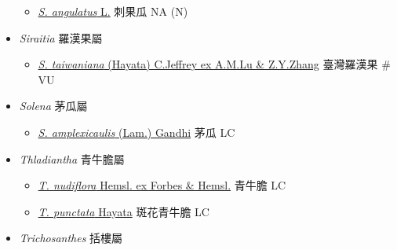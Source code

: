 \begin{itemize}
  \begin{itemize}
        \item[] \href{http://www.theplantlist.org/tpl1.1/search?q=Sicyos+angulatus}{\textit{S. angulatus} L.}   刺果瓜   NA (N)
  \end{itemize}
 \item[] \textit{Siraitia} 羅漢果屬
                                
  \begin{itemize}
        \item[] \href{http://www.theplantlist.org/tpl1.1/search?q=Siraitia+taiwaniana}{\textit{S. taiwaniana} (Hayata) C.Jeffrey ex A.M.Lu \& Z.Y.Zhang}   臺灣羅漢果  \# VU
  \end{itemize}
 \item[] \textit{Solena} 茅瓜屬
                                
  \begin{itemize}
        \item[] \href{http://www.theplantlist.org/tpl1.1/search?q=Solena+amplexicaulis}{\textit{S. amplexicaulis} (Lam.) Gandhi}   茅瓜   LC
  \end{itemize}
 \item[] \textit{Thladiantha} 青牛膽屬
                                
  \begin{itemize}
        \item[] \href{http://www.theplantlist.org/tpl1.1/search?q=Thladiantha+nudiflora}{\textit{T. nudiflora} Hemsl. ex Forbes \& Hemsl.}   青牛膽   LC
        \item[] \href{http://www.theplantlist.org/tpl1.1/search?q=Thladiantha+punctata}{\textit{T. punctata} Hayata}   斑花青牛膽   LC
  \end{itemize}
 \item[] \textit{Trichosanthes} 括樓屬
                                

\end{itemize}
